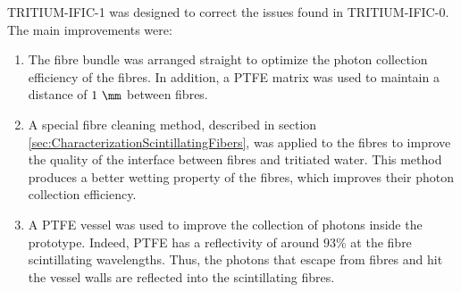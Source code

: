 TRITIUM-IFIC-1 was designed to correct the issues found in TRITIUM-IFIC-0. The main improvements were:

\begin{enumerate}

\item{} The fibre bundle was arranged straight to optimize the photon collection efficiency of the fibres. In addition, a PTFE matrix was used to maintain a distance of $1~\mm$ between fibres.

\item{} A special fibre cleaning method, described in section \ref{sec:CharacterizationScintillatingFibers}, was applied to the fibres to improve the quality of the interface between fibres and tritiated water. This method produces a better wetting property of the fibres, which improves their photon collection efficiency.

\item{} A PTFE vessel was used to improve the collection of photons inside the prototype. Indeed, PTFE has a reflectivity of around $93\%$ \cite{Reflectivity} at the fibre scintillating wavelengths. Thus, the photons that escape from fibres and hit the vessel walls are reflected into the scintillating fibres.

\end{enumerate}

